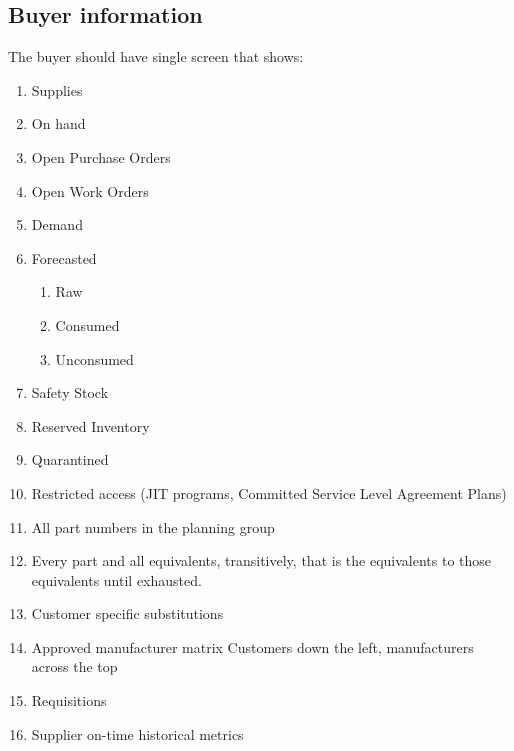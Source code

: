 \documentclass[letterpaper,10pt,english]{sphinxmanual}
\begin{document}
\subsection{Buyer information}
\label{BusinessProcessReengineering:buyer-information}
The buyer should have single screen that shows:
\begin{enumerate}
\item {} 
Supplies

\item {} 
On hand

\item {} 
Open Purchase Orders

\item {} 
Open Work Orders

\item {} 
Demand

\item {} 
Forecasted
\begin{enumerate}
\item {} 
Raw

\item {} 
Consumed

\item {} 
Unconsumed

\end{enumerate}

\item {} 
Safety Stock

\item {} 
Reserved Inventory

\item {} 
Quarantined

\item {} 
Restricted access (JIT programs, Committed Service Level Agreement
Plans)

\item {} 
All part numbers in the planning group

\item {} 
Every part and all equivalents, transitively, that is the equivalents
to those equivalents until exhausted.

\item {} 
Customer specific substitutions

\item {} 
Approved manufacturer matrix Customers down the left, manufacturers
across the top

\item {} 
Requisitions

\item {} 
Supplier on-time historical metrics


\end{enumerate}
\end{document}

